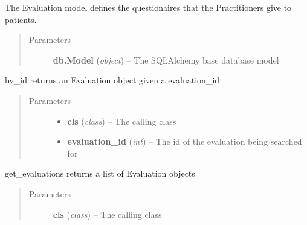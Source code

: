 \documentclass[letterpaper,10pt,english]{sphinxmanual}
\begin{document}
\begin{fulllineitems}
\label{dev-evaluations:cagenix.evaluations.models.Evaluation}
The Evaluation model defines the questionaires that the Practitioners
give to patients.
\begin{quote}\begin{description}
\item[{Parameters}] \leavevmode
\textbf{db.Model} (\emph{object}) -- The SQLAlchemy base database model

\end{description}\end{quote}

\begin{fulllineitems}
\label{dev-evaluations:cagenix.evaluations.models.Evaluation.by_id}
by\_id returns an Evaluation object given a evaluation\_id
\begin{quote}\begin{description}
\item[{Parameters}] \leavevmode\begin{itemize}
\item {} 
\textbf{cls} (\emph{class}) -- The calling class

\item {} 
\textbf{evaluation\_id} (\emph{int}) -- The id of the evaluation being searched for

\end{itemize}

\end{description}\end{quote}

\end{fulllineitems}


\begin{fulllineitems}
\label{dev-evaluations:cagenix.evaluations.models.Evaluation.get_evaluations}
get\_evaluations returns a list of Evaluation objects
\begin{quote}\begin{description}
\item[{Parameters}] \leavevmode
\textbf{cls} (\emph{class}) -- The calling class

\end{description}\end{quote}

\end{fulllineitems}


\end{fulllineitems}
\end{document}
